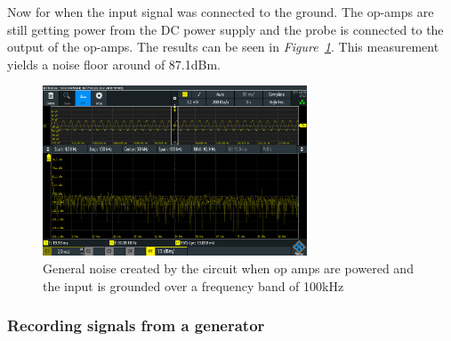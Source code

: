\clearpage



Now for when the input signal was connected to the ground.
The op-amps are still getting power from the DC power supply and the probe is connected to the output of the op-amps.
The results can be seen in \textit{Figure~\ref{fig:noisefloor100k}}.
This measurement yields a noise floor around of 87.1dBm.


\begin{figure}[h]
    \centering
    \includegraphics[width=0.7\textwidth]{graphics/NoiseFloor100k.PNG}
    \caption{General noise created by the circuit when op amps are powered and the input is grounded over a frequency band of 100kHz}
    \label{fig:noisefloor100k}
\end{figure}



\subsubsection{Recording signals from a generator}

